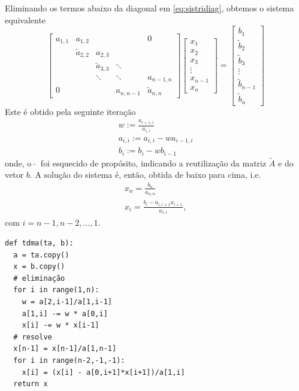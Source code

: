 Eliminando os termos abaixo da diagonal em \eqref{eq:sistridiag}, obtemos o sistema equivalente
\begin{equation}
  \begin{bmatrix}
    a_{1,1} & a_{1,2} & & & 0\\
      & \tilde{a}_{2,2} & a_{2,3} & & \\
    &  & \tilde{a}_{3,3} & \ddots & \\
    & & \ddots & \ddots & a_{n-1,n}\\
    0 & & &  a_{n,n-1} & \tilde{a}_{n,n}
  \end{bmatrix}
  \begin{bmatrix}
    x_1\\
    x_2\\
    x_3\\
    \vdots\\
    x_{n-1}\\
    x_n
  \end{bmatrix} =
    \begin{bmatrix}
    b_1\\
    \tilde{b}_2\\
    \tilde{b}_3\\
    \vdots\\
    \tilde{b}_{n-1}\\
    \tilde{b}_n
  \end{bmatrix}
\end{equation}
Este é obtido pela seguinte iteração
\begin{gather}
  w := \frac{a_{i+1,i}}{a_{i,i}}\\
  a_{i,i} := a_{i,i} - w a_{i-1,i}\\
  b_i := b_i - w b_{i-1}
\end{gather}
onde, o $~\tilde{}~$ foi esquecido de propósito, indicando a reutilização da matriz $\tilde{A}$ e do vetor $b$. A solução do sistema é, então, obtida de baixo para cima, i.e.
\begin{gather}
  x_n = \frac{b_n}{a_{n,n}}\\
  x_i = \frac{b_i - a_{i,i+1}x_{i+1}}{a_{i,i}},
\end{gather}
com $i=n-1,n-2,\dotsc,1$.

% 

\begin{lstlisting}[caption=TDMA, label={py:tdma}]
def tdma(ta, b):
  a = ta.copy()
  x = b.copy()
  # eliminação
  for i in range(1,n):
    w = a[2,i-1]/a[1,i-1]
    a[1,i] -= w * a[0,i]
    x[i] -= w * x[i-1]
  # resolve
  x[n-1] = x[n-1]/a[1,n-1]
  for i in range(n-2,-1,-1):
    x[i] = (x[i] - a[0,i+1]*x[i+1])/a[1,i]
  return x
\end{lstlisting}

